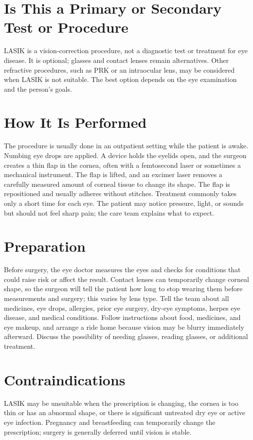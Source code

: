 \section*{Is This a Primary or Secondary Test or Procedure}
LASIK is a vision-correction procedure, not a diagnostic test or treatment for eye disease. It is optional; glasses and contact lenses remain alternatives. Other refractive procedures, such as PRK or an intraocular lens, may be considered when LASIK is not suitable. The best option depends on the eye examination and the person's goals.

\section*{How It Is Performed}
The procedure is usually done in an outpatient setting while the patient is awake. Numbing eye drops are applied. A device holds the eyelids open, and the surgeon creates a thin flap in the cornea, often with a femtosecond laser or sometimes a mechanical instrument. The flap is lifted, and an excimer laser removes a carefully measured amount of corneal tissue to change its shape. The flap is repositioned and usually adheres without stitches. Treatment commonly takes only a short time for each eye. The patient may notice pressure, light, or sounds but should not feel sharp pain; the care team explains what to expect.

\section*{Preparation}
Before surgery, the eye doctor measures the eyes and checks for conditions that could raise risk or affect the result. Contact lenses can temporarily change corneal shape, so the surgeon will tell the patient how long to stop wearing them before measurements and surgery; this varies by lens type. Tell the team about all medicines, eye drops, allergies, prior eye surgery, dry-eye symptoms, herpes eye disease, and medical conditions. Follow instructions about food, medicines, and eye makeup, and arrange a ride home because vision may be blurry immediately afterward. Discuss the possibility of needing glasses, reading glasses, or additional treatment.

\section*{Contraindications}
LASIK may be unsuitable when the prescription is changing, the cornea is too thin or has an abnormal shape, or there is significant untreated dry eye or active eye infection. Pregnancy and breastfeeding can temporarily change the prescription; surgery is generally deferred until vision is stable.

